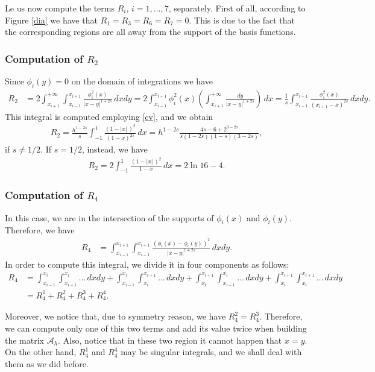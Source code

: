 Le us now compute the terms $R_i$, $i=1,\ldots,7$, separately. First of all, according to Figure \ref{dia} we have that $R_1=R_3=R_6=R_7=0.$ This is due to the fact that the corresponding regions are all away from the support of the basis functions. 
\subsubsection*{Computation of $R_2$}
Since $\phi_i(y) = 0$ on the domain of integrations we have
\begin{align*}
	R_2 &= 2\int_{x_{i+1}}^{+\infty}\int_{x_{i-1}}^{x_{i+1}} \frac{\phi_i^2(x)}{|x-y|^{1+2s}}\,dxdy = 2\int_{x_{i-1}}^{x_{i+1}}\phi_i^2(x)\left(\int_{x_{i+1}}^{+\infty} \frac{dy}{|x-y|^{1+2s}}\right)\,dx = \frac{1}{s}\int_{x_{i-1}}^{x_{i+1}}\frac{\phi_i^2(x)}{(x_{i+1}-x)^{2s}}\,dxdy.
\end{align*}
This integral is computed employing \eqref{cv}, and we obtain
\begin{align}\label{R2}
	R_2 = \frac{h^{1-2s}}{s}\int_{-1}^1 \frac{(1-|x|\,)^2}{(1-x)^{2s}}\,dx = h^{1-2s}\frac{4s-6+2^{3-2s}}{s(1-2s)(1-s)(3-2s)}, 
\end{align}
if $s\neq 1/2$. If $s=1/2$, instead, we have
\begin{align*}
	R_2 = 2\int_{-1}^1 \frac{(1-|x|\,)^2}{1-x}\,dx = 2\ln 16-4.
\end{align*}

\subsubsection*{Computation of $R_4$}
In this case, we are in the intersection of the supports of $\phi_i(x)$ and $\phi_i(y)$. Therefore, we have
\begin{align*}
	R_4 &= \int_{x_{i-1}}^{x_{i+1}}\int_{x_{i-1}}^{x_{i+1}} \frac{(\phi_i(x)-\phi_i(y))^2}{|x-y|^{1+2s}}\,dxdy. 
\end{align*}
In order to compute this integral, we divide it in four components as follows:
\begin{align*}
	R_4 &= \int_{x_{i-1}}^{x_i}\int_{x_{i-1}}^{x_i} \ldots\,dxdy + \int_{x_{i-1}}^{x_i}\int_{x_i}^{x_{i+1}} \ldots\,dxdy +
	\int_{x_i}^{x_{i+1}}\int_{x_{i-1}}^{x_i} \ldots\,dxdy +  \int_{x_i}^{x_{i+1}}\int_{x_i}^{x_{i+1}} \ldots\,dxdy
	\\
	&= R_4^1 + R_4^2 + R_4^3 + R_4^4.
\end{align*}

Moreover, we notice that, due to symmetry reason, we have $R_4^2 = R_4^3$. Therefore, we can compute only one of this two terms and add its value twice when building the matrix $\mathcal A_h$. Also, notice that in these two region it cannot happen that $x=y$. On the other hand, $R_4^1$ and $R_4^4$ may be singular integrals, and we shall deal with them as we did before. 

